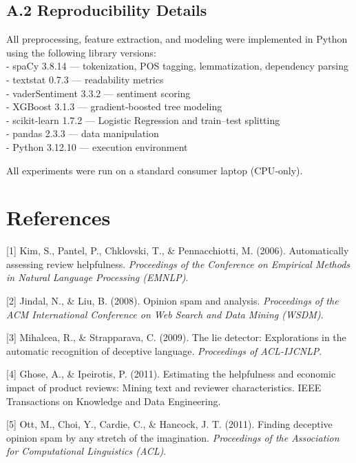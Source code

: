 \documentclass[
]{article}
\begin{document}
\hypertarget{a.2-reproducibility-details}{%
\subsection{A.2 Reproducibility
Details}\label{a.2-reproducibility-details}}

All preprocessing, feature extraction, and modeling were implemented in
Python using the following library versions:\\
- spaCy 3.8.14 --- tokenization, POS tagging, lemmatization, dependency
parsing\\
- textstat 0.7.3 --- readability metrics\\
- vaderSentiment 3.3.2 --- sentiment scoring\\
- XGBoost 3.1.3 --- gradient‑boosted tree modeling\\
- scikit-learn 1.7.2 --- Logistic Regression and train--test splitting\\
- pandas 2.3.3 --- data manipulation\\
- Python 3.12.10 --- execution environment

All experiments were run on a standard consumer laptop (CPU‑only).

\hypertarget{references}{%
\section{References}\label{references}}

{[}1{]} Kim, S., Pantel, P., Chklovski, T., \& Pennacchiotti, M. (2006).
Automatically assessing review helpfulness. \emph{Proceedings of the
Conference on Empirical Methods in Natural Language Processing (EMNLP)}.

{[}2{]} Jindal, N., \& Liu, B. (2008). Opinion spam and analysis.
\emph{Proceedings of the ACM International Conference on Web Search and
Data Mining (WSDM)}.

{[}3{]} Mihalcea, R., \& Strapparava, C. (2009). The lie detector:
Explorations in the automatic recognition of deceptive language.
\emph{Proceedings of ACL‑IJCNLP}.

{[}4{]} Ghose, A., \& Ipeirotis, P. (2011). Estimating the helpfulness
and economic impact of product reviews: Mining text and reviewer
characteristics. IEEE Transactions on Knowledge and Data Engineering.

{[}5{]} Ott, M., Choi, Y., Cardie, C., \& Hancock, J. T. (2011). Finding
deceptive opinion spam by any stretch of the imagination.
\emph{Proceedings of the Association for Computational Linguistics
(ACL)}.
\end{document}
